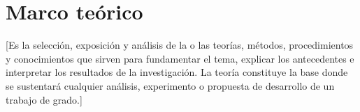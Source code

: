 \chapter{Marco teórico}
[Es la selección, exposición y análisis de la o las teorías, métodos, procedimientos y conocimientos que sirven para fundamentar el tema, explicar los antecedentes e interpretar los resultados de la investigación. La teoría constituye la base donde se sustentará cualquier análisis, experimento o propuesta de desarrollo de un trabajo de grado.]